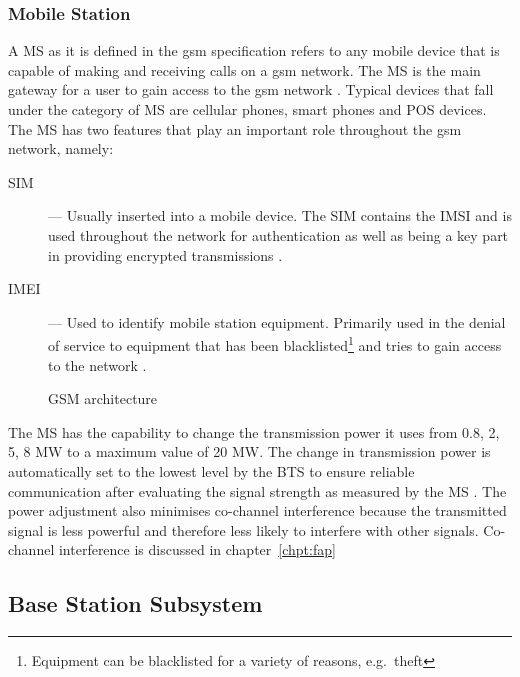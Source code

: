 \subsubsection{Mobile Station}
A \gls{MS}  as it is defined in the \gls{gsm} specification refers to any mobile device that is capable of making and receiving calls on a \gls{gsm} network.  The \gls{MS} is the main gateway 
for a user to gain access to the \gls{gsm} network \cite{Eisenblatter,GSMArchitectureProtocolsServices}. Typical devices that fall under the category of \gls{MS} are cellular phones, smart phones and \gls{POS} devices. The \gls{MS} has two features that play an important role throughout the \gls{gsm} network, namely:
\begin{description}
  \item[\gls{SIM}] --- Usually inserted into a mobile device. The \gls{SIM} contains the \gls{IMSI} and is used throughout the network for authentication as well as being a key part in providing encrypted transmissions \cite{Eisenblatter}.
\item[\gls{IMEI}] --- Used to identify mobile station equipment. Primarily used in the denial of service to equipment that has been blacklisted\footnote{Equipment can be blacklisted for a variety of reasons, e.g.\ theft} and tries to gain access to the network \cite{Eisenblatter}.
\end{description}
\begin{figure}[H]
	\begin{centering}
		
		\caption{GSM architecture\cite{GSMArchitectureProtocolsServices}}
		\label{fig:GSMArchitecture}
	\end{centering}
\end{figure}
The \gls{MS} has the capability to change the transmission power it uses from 0.8, 2, 5, 8 MW to a maximum value of 20 MW\cite{GSMSysEngin}. The change in transmission power is automatically set to the lowest level by the \gls{BTS} to ensure reliable communication after evaluating the signal strength as measured by the \gls{MS} \cite{GSMSysEngin,GSMArchitectureProtocolsServices}. The power adjustment also minimises co-channel interference because the transmitted signal is less powerful and therefore less likely to interfere with other signals\cite{GSMSysEngin}. Co-channel interference is discussed in chapter~\ref{chpt:fap}

\subsection{Base Station Subsystem}

